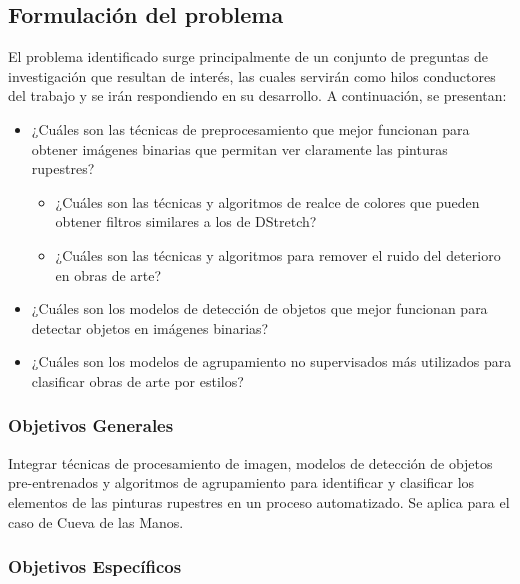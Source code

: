 \subsection{Formulación del problema}

El problema identificado surge principalmente de un conjunto de preguntas de investigación que resultan de interés, las cuales servirán como hilos conductores del trabajo y se irán respondiendo en su desarrollo. A continuación, se presentan:

\begin{itemize}
    \item ¿Cuáles son las técnicas de preprocesamiento que mejor funcionan para obtener imágenes binarias que permitan ver claramente las pinturas rupestres?
    \begin{itemize}
        \item ¿Cuáles son las técnicas y algoritmos de realce de colores que pueden obtener filtros similares a los de DStretch?
        \item ¿Cuáles son las técnicas y algoritmos para remover el ruido del deterioro en obras de arte?
    \end{itemize}
    \item ¿Cuáles son los modelos de detección de objetos que mejor funcionan para detectar objetos en imágenes binarias?
    \item ¿Cuáles son los modelos de agrupamiento no supervisados más utilizados para clasificar obras de arte por estilos?
\end{itemize}

\subsubsection{Objetivos Generales}

Integrar técnicas de procesamiento de imagen, modelos de detección de objetos pre-entrenados y algoritmos de agrupamiento para identificar y clasificar los elementos de las pinturas rupestres en un proceso automatizado. Se aplica para el caso de Cueva de las Manos.

\subsubsection{Objetivos Específicos}


